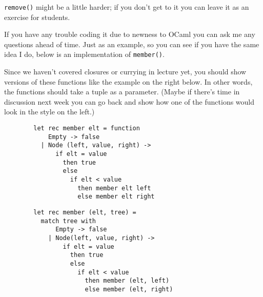 \documentclass[12pt]{article}
\begin{document}
      \bigskip\medskip

      \texttt{remove()} might be a little harder; if you don't get to it you
    can leave it as an exercise for students.

      If you have any trouble coding it due to newness to OCaml you can ask me
    any questions ahead of time.  Just as an example, so you can see if you
    have the same idea I do, below is an implementation of
    \texttt{member()}.


      Since we haven't covered closures or currying in lecture yet, you should
    show versions of these functions like the example on the right below.
    In other words, the functions should take a tuple as a parameter.
    (Maybe if there's time in discussion next week you can go back and show
    how one of the functions would look in the style on the left.)

      \vspace{-1mm}

      \raggedcolumns

      \begin{multicols}{2}

        \begin{Verbatim}
        let rec member elt = function
            Empty -> false
          | Node (left, value, right) ->
              if elt = value
                then true
                else
                  if elt < value
                    then member elt left
                    else member elt right
        \end{Verbatim}

        \columnbreak

        \begin{Verbatim}
        let rec member (elt, tree) =
          match tree with
              Empty -> false
            | Node(left, value, right) ->
                if elt = value
                  then true
                  else 
                    if elt < value
                      then member (elt, left)
                      else member (elt, right)
        \end{Verbatim}

      \end{multicols}
\end{document}
